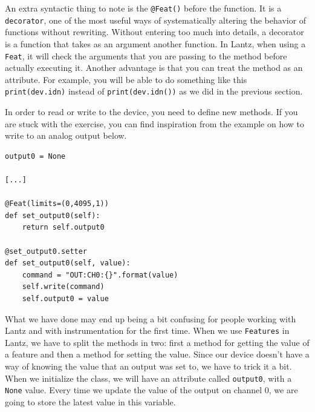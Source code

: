 An extra syntactic thing to note is the \texttt{@Feat()} before the
function. It is a \texttt{decorator}, one of the most useful ways of
systematically altering the behavior of functions without rewriting.
Without entering too much into details, a decorator is a function that
takes as an argument another function. In Lantz, when using a
\texttt{Feat}, it will check the arguments that you are passing to the
method before actually executing it. Another advantage is that you can treat the method as an attribute. For example, you will be able to do something like this
\texttt{print(dev.idn)} instead of \texttt{print(dev.idn())} as we did
in the previous section.


In order to read or write to the device, you need to define new methods.
If you are stuck with the exercise, you can find inspiration from the
example on how to write to an analog output below.

\begin{verbatim}
output0 = None

[...]

@Feat(limits=(0,4095,1))
def set_output0(self):
    return self.output0

@set_output0.setter
def set_output0(self, value):
    command = "OUT:CH0:{}".format(value)
    self.write(command)
    self.output0 = value
\end{verbatim}

What we have done may end up being a bit confusing for people working with
Lantz and with instrumentation for the first time. When we use
\texttt{Features} in Lantz, we have to split the methods in two: first a
method for getting the value of a feature and then a method for setting
the value. Since our device doesn't have a way of knowing the value that
an output was set to, we have to trick it a bit. When we initialize the
class, we will have an attribute called \texttt{output0}, with a
\texttt{None} value. Every time we update the value of the output on
channel 0, we are going to store the latest value in this variable.

